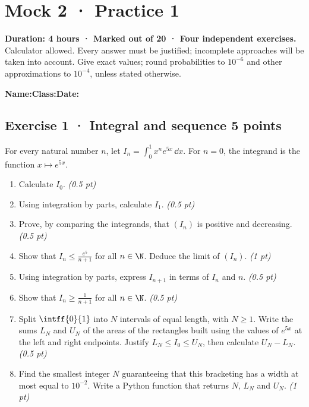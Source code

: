 \mxnewpage{}\label{sujet:8-1}

\section*{Mock 2 · Practice 1}


\textbf{Duration: 4 hours · Marked out of 20 · Four independent exercises.}\\Calculator allowed. Every answer must be justified; incomplete approaches will be taken into account. Give exact values; round probabilities to $10^{-6}$ and other approximations to $10^{-4}$, unless stated otherwise.

\smallskip\textbf{Name:}\enspace\dotfill\quad\textbf{Class:}\enspace\dotfill\quad\textbf{Date:}\enspace\dotfill

\subsection*{Exercise 1 · Integral and sequence \hfill 5 points}For every natural number $n$, let $I_n=\displaystyle\int_0^1x^ne^{5x}\,\dd x$. For $n=0$, the integrand is the function $x\mapsto e^{5x}$.

\begin{enumerate}

\item Calculate $I_0$. \hfill\textit{(0.5 pt)}

\item Using integration by parts, calculate $I_1$. \hfill\textit{(0.5 pt)}

\item Prove, by comparing the integrands, that $(I_n)$ is positive and decreasing. \hfill\textit{(0.5 pt)}

\item Show that $I_n\le\frac{e^{5}}{n+1}$ for all $n\in\N$. Deduce the limit of $(I_n)$. \hfill\textit{(1 pt)}

\item Using integration by parts, express $I_{n+1}$ in terms of $I_n$ and $n$. \hfill\textit{(0.5 pt)}

\item Show that $I_n\ge\frac1{n+1}$ for all $n\in\N$. \hfill\textit{(0.5 pt)}

\item Split $\intff{0}{1}$ into $N$ intervals of equal length, with $N\ge1$. Write the sums $L_N$ and $U_N$ of the areas of the rectangles built using the values of $e^{5x}$ at the left and right endpoints. Justify $L_N\le I_0\le U_N$, then calculate $U_N-L_N$. \hfill\textit{(0.5 pt)}

\item Find the smallest integer $N$ guaranteeing that this bracketing has a width at most equal to $10^{-2}$. Write a Python function that returns $N$, $L_N$ and $U_N$. \hfill\textit{(1 pt)}

\end{enumerate}

